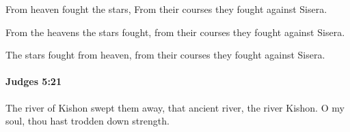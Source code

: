 			\begin{versebox}
					\item[BHS] 
					\item[ASV] From heaven fought the stars, From their courses they fought against Sisera.
					\item[NIV] From the heavens the stars fought, from their courses they fought against Sisera.
					\item[NRSV] The stars fought from heaven, from their courses they fought against Sisera.
			\end{versebox}

		\paragraph{Judges 5:21} %
			\label{JUDGES-5-21}

			The river of Kishon swept them away, that ancient river, the river Kishon. O my soul, thou hast trodden down strength.

